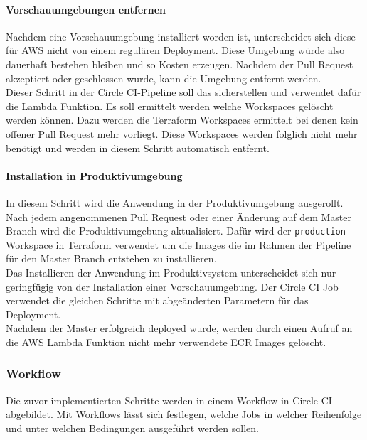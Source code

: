 \paragraph{Vorschauumgebungen entfernen}

Nachdem eine Vorschauumgebung installiert worden ist, unterscheidet sich diese für AWS nicht von einem regulären Deployment.
Diese Umgebung würde also dauerhaft bestehen bleiben und so Kosten erzeugen.
Nachdem der Pull Request akzeptiert oder geschlossen wurde, kann die Umgebung entfernt werden. \\

Dieser \hyperref[lst:circle_job_remove_preview_deployments]{Schritt} in der Circle CI-Pipeline soll das sicherstellen
und verwendet dafür die Lambda Funktion.
Es soll ermittelt werden welche Workspaces gelöscht werden können.
Dazu werden die Terraform Workspaces ermittelt bei denen kein offener Pull Request mehr vorliegt.
Diese Workspaces werden folglich nicht mehr benötigt und werden in diesem Schritt automatisch entfernt.

\paragraph{Installation in Produktivumgebung}

In diesem \hyperref[lst:circle_job_deploy_production]{Schritt} wird die Anwendung in der Produktivumgebung ausgerollt.
Nach jedem angenommenen Pull Request oder einer Änderung auf dem Master Branch wird die Produktivumgebung aktualisiert.
Dafür wird der \texttt{production} Workspace in Terraform verwendet um die Images die im Rahmen der Pipeline für den Master Branch entstehen zu installieren. \\

Das Installieren der Anwendung im Produktivsystem unterscheidet sich nur geringfügig von der Installation einer Vorschauumgebung.
Der Circle CI Job verwendet die gleichen Schritte mit abgeänderten Parametern für das Deployment. \\

Nachdem der Master erfolgreich deployed wurde, werden durch einen Aufruf an die AWS Lambda Funktion nicht mehr verwendete ECR Images gelöscht.

\subsubsection{Workflow}

Die zuvor implementierten Schritte werden in einem Workflow in Circle CI abgebildet.
Mit Workflows lässt sich festlegen, welche Jobs in welcher Reihenfolge und unter welchen Bedingungen ausgeführt werden sollen. \\

